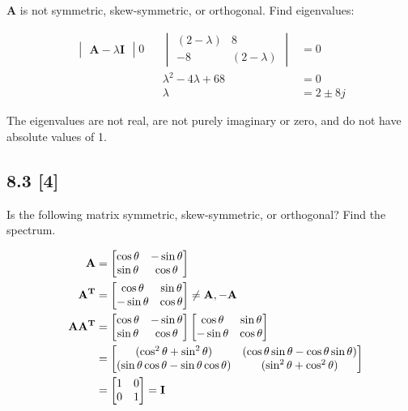 \documentclass{article}
\begin{document}
\textbf{A} is not symmetric, skew-symmetric, or orthogonal.  Find eigenvalues:

\begin{align}
    \label{eq:5}
    \begin{vmatrix}
    \textbf{A} - \lambda \textbf{I}
    \end{vmatrix} 0 && \begin{vmatrix}
    (2-\lambda) & 8\\
    -8 & (2-\lambda)
    \end{vmatrix} &= 0
    \\
    \label{eq:6}
    && \lambda^2 -4\lambda +68 &= 0
    \\
    \label{eq:7}
    && \lambda &= 2 \pm 8j
\end{align}

The eigenvalues are not real, are not purely imaginary or zero, and do not have absolute values of 1.

\subsection*{8.3 [4]}
\setcounter{equation}{0}

Is the following matrix symmetric, skew-symmetric, or orthogonal?  Find the spectrum.

\begin{align}
    \label{eq:1}
    && \textbf{A} &= \begin{bmatrix}
    \cos{\theta} & -\sin{\theta}\\
    \sin{\theta} & \cos{\theta}
    \end{bmatrix}
    \\
    \label{eq:2}
    && \textbf{A\textsuperscript{T}} &= \begin{bmatrix}
    \cos{\theta} & \sin{\theta}\\
    -\sin{\theta} & \cos{\theta}
    \end{bmatrix} \neq \textbf{A}, -\textbf{A}
    \\
    \label{eq:3}
    && \textbf{AA\textsuperscript{T}} &= \begin{bmatrix}
    \cos{\theta} & -\sin{\theta}\\
    \sin{\theta} & \cos{\theta}
    \end{bmatrix} \begin{bmatrix}
    \cos{\theta} & \sin{\theta}\\
    -\sin{\theta} & \cos{\theta}
    \end{bmatrix}
    \\
    \label{eq:4}
    && &= \begin{bmatrix}
    (\cos^2 \theta + \sin^2 \theta) & (\cos{\theta}\sin{\theta} - \cos{\theta}\sin{\theta})\\
    (\sin{\theta}\cos{\theta} - \sin{\theta}\cos{\theta}) & (\sin^2 \theta + \cos^2 \theta)
    \end{bmatrix}
    \\
    \label{eq:5}
    && &= \begin{bmatrix}
    1 & 0\\
    0 & 1
    \end{bmatrix} = \textbf{I}
\end{align}
\end{document}
